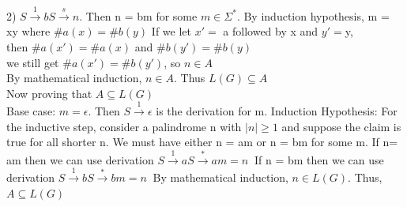 \documentclass[12pt]{article}
\begin{document}
2) $S\xrightarrow{1} bS  \xrightarrow{s} n$. Then n = bm for some $m\in \Sigma^*$. By induction hypothesis, m = xy where $\#a(x) = \#b(y)$ If we let $x' =$ a followed by x and $y' = $y, \\
then $\#a(x') = \#a(x)  $ and  $\#b(y') = \#b(y)  $\\we still get $\# a(x') = \# b(y')$, so $n \in A$\\
By mathematical induction,  $n \in A$. Thus $L(G) \subseteq A$\\

Now proving that $A \subseteq L(G)$\\
Base case: $m = \epsilon$. Then $S\xrightarrow{1} \epsilon$ is the derivation for m.
Induction Hypothesis: For the inductive step, consider a palindrome n with $|n| \ge 1$ and suppose the claim is true for all shorter n. 
We must have either n = am or n = bm for some m.
If n= am then we can use derivation $S \xrightarrow{1} aS \xrightarrow{*} am =n \ $
If n = bm then we can use derivation $S \xrightarrow{1} bS \xrightarrow{*} bm =n \ $
By mathematical induction, $n\in L(G)$. Thus, $A \subseteq L(G)$\\
\end{document}

